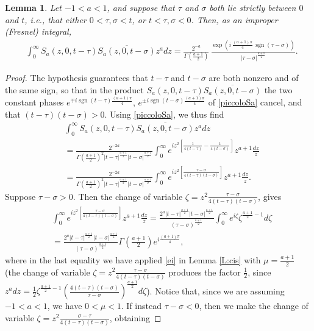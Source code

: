 \documentclass[11pt,letter]{amsart}
\def \G{\Gamma}
\numberwithin{equation}{section}
\newtheorem{lemma}[theorem]{Lemma}
\numberwithin{equation}{section}
\begin{document}
\begin{lemma}\label{L:piccoloSa}
Let $-1<a<1$, and suppose that $\tau$ and $\sigma$ both lie strictly between $0$ and $t$, i.e., that either $0<\tau,\sigma<t$, or $t<\tau,\sigma<0$. Then, as an improper (Fresnel) integral,
\begin{align}\label{ohoh}
& \int_0^\infty S_a(z,0,t-\tau)\overline{S_a(z,0,t-\sigma)} z^a dz =
\frac{2^{-a}}{\Gamma\!\left(\frac{a+1}{2}\right)}
\,\frac{\exp\!\left(i\,\frac{(a+1)\pi}{4}\,\operatorname{sgn}(\tau-\sigma)\right)}{|\tau-\sigma|^{\frac{a+1}{2}}}.
\end{align}
\end{lemma}

\begin{proof}
The hypothesis guarantees that $t-\tau$ and $t-\sigma$ are both nonzero and of the same sign, so that in the product $S_a(z,0,t-\tau)\overline{S_a(z,0,t-\sigma)}$ the two constant phases $e^{\mp i\operatorname{sgn}(t-\tau)\frac{(a+1)\pi}4}$, $e^{\pm i \operatorname{sgn}(t-\sigma)\frac{(a+1)\pi}4}$ of \eqref{piccoloSa} cancel, and that $(t-\tau)(t-\sigma)>0$. Using \eqref{piccoloSa}, we thus find
\begin{align*}
& \int_0^\infty S_a(z,0,t-\tau)\overline{S_a(z,0,t-\sigma)} z^a dz
\\
& = \frac{2^{-2a}}{\G(\frac{a+1}2)^2|t-\tau|^{\frac{a+1}2}|t-\sigma|^{\frac{a+1}2}} \int_0^\infty  e^{i z^2\left[\frac{1}{4(t-\tau)} - \frac{1}{4(t-\sigma)}\right]} z^{a+1} \frac{dz}z
\\
&  =  \frac{2^{-2a}}{\G(\frac{a+1}2)^2|t-\tau|^{\frac{a+1}2}|t-\sigma|^{\frac{a+1}2}} \int_0^\infty  e^{i z^2\left[\frac{\tau-\sigma}{4(t-\tau)(t-\sigma)}\right]} z^{a+1} \frac{dz}z.
\end{align*}
Suppose $\tau-\sigma>0$. Then the change of variable $\zeta = z^2 \frac{\tau-\sigma}{4(t-\tau)(t-\sigma)}$, gives
\begin{align*}
& \int_0^\infty  e^{i z^2\left[\frac{\tau-\sigma}{4(t-\tau)(t-\sigma)}\right]} z^{a+1} \frac{dz}z = \frac{2^{a}|t-\tau|^{\frac{a+1}2}|t-\sigma|^{\frac{a+1}2}}{(\tau-\sigma)^{\frac{a+1}2}}\int_0^\infty  e^{i \zeta} \zeta^{\frac{a+1}2-1}d\zeta
\\
& = \frac{2^{a}|t-\tau|^{\frac{a+1}2}|t-\sigma|^{\frac{a+1}2}}{(\tau-\sigma)^{\frac{a+1}2}} \G(\frac{a+1}2) e^{i\frac{(a+1)\pi}{4}},
\end{align*}
where in the last equality we have applied \eqref{ei} in Lemma \ref{L:cis} with $\mu = \frac{a+1}2$ (the change of variable $\zeta = z^2\frac{\tau-\sigma}{4(t-\tau)(t-\sigma)}$ produces the factor $\frac 12$, since $z^a dz = \frac 12 \zeta^{\frac{a+1}2 -1}\left(\frac{4(t-\tau)(t-\sigma)}{\tau-\sigma}\right)^{\frac{a+1}{2}} d\zeta$). Notice that, since we are assuming $-1<a<1$, we have $0<\mu<1$. If instead $\tau-\sigma<0$, then we make the change of variable $\zeta = z^2 \frac{\sigma-\tau}{4(t-\tau)(t-\sigma)}$, obtaining 

\end{proof}
\end{document}
